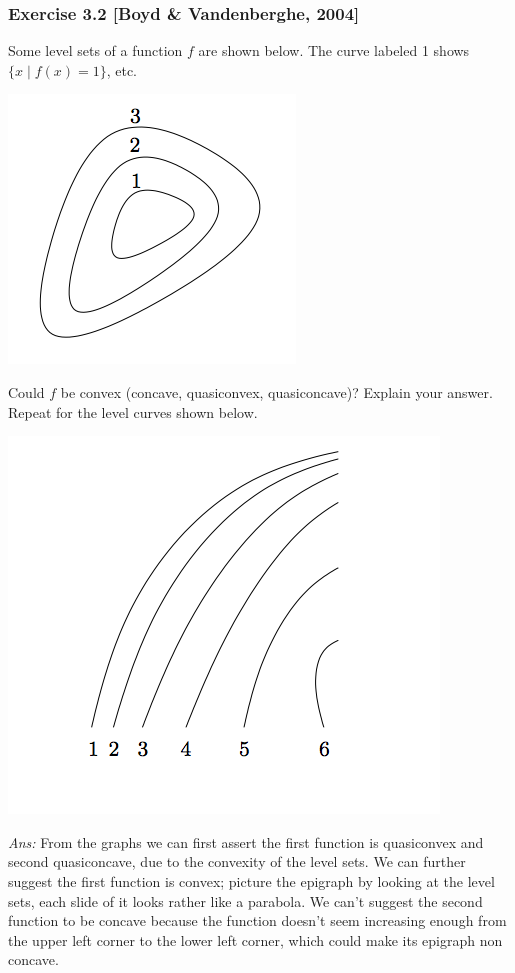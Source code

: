 \documentclass[12pt,a4paper]{article}
\begin{document}
\newpage\subsubsection*{Exercise 3.2 [Boyd \& Vandenberghe, 2004]}
 Some level sets of a function $f$ are shown below. The curve labeled 1 shows $\{x \mid f(x) = 1\}$, etc.
\begin{center}
\includegraphics[scale=0.5]{hw2_p32-1.png}
\end{center}
Could $f$ be convex (concave, quasiconvex, quasiconcave)? Explain your answer. Repeat for the level curves shown below. 
\begin{center}
\includegraphics[scale=0.5]{hw2_p32-2.png}
\end{center}
{\it Ans:} From the graphs we can first assert the first function is quasiconvex and second quasiconcave, due to the convexity of the level sets. We can further suggest the first function is convex; picture the epigraph by looking at the level sets, each slide of it looks rather like a parabola. We can't suggest the second function to be concave because the function doesn't seem increasing enough from the upper left corner to the lower left corner, which could make its epigraph non concave. 
\end{document}
